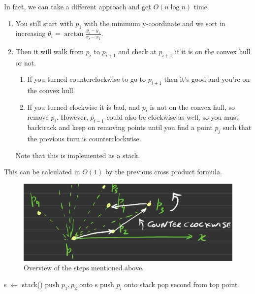 \documentclass{article}
\begin{document}
  \begin{example}
    In fact, we can take a different approach and get $O(n \log{n})$ time. 
    \begin{enumerate}
      \item You still start with $p_1$ with the minimum y-coordinate and we sort in increasing $\theta_i = \arctan \frac{y_i - y_1}{x_i - x_1}$. 
      \item Then it will walk from $p_i$ to $p_{i+1}$ and check at $p_{i+1}$ if it is on the convex hull or not. 
        \begin{enumerate}
          \item If you turned counterclockwise to go to $p_{i+1}$ then it's good and you're on the convex hull. 
          \item If you turned clockwise it is bad, and $p_i$ is not on the convex hull, so remove $p_i$. However, $p_{i-1}$ could also be clockwise as well, so you must backtrack and keep on removing points until you find a point $p_j$ such that the previous turn is counterclockwise. 
        \end{enumerate}
        Note that this is implemented as a stack. 
    \end{enumerate}
    This can be calculated in $O(1)$ by the previous cross product formula. 
    \begin{figure}[H]
      \centering 
      \includegraphics[scale=0.4]{img/graham.png}
      \caption{Overview of the steps mentioned above. } 
      \label{fig:graham}
    \end{figure}
    \begin{algorithm}[H]
      \label{alg:graham}
      \begin{algorithmic}
          \State s $\gets$ stack()
          \State push $p_1, p_2$ onto s 
            \State push $p_i$ onto stack 
              \State pop second from top point 

\end{algorithmic}
\end{algorithm}
\end{example}
\end{document}
